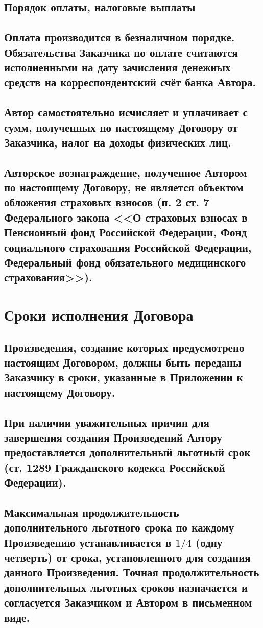 \documentclass[12pt]{article}
\begin{document}
\subsection*{\bf Порядок оплаты, налоговые выплаты}

\subsection{Оплата производится в безналичном порядке. Обязательства Заказчика по оплате считаются исполненными на дату зачисления денежных средств на корреспондентский счёт банка Автора.}

\subsection{Автор самостоятельно исчисляет и уплачивает с сумм, полученных по настоящему Договору от Заказчика, налог на доходы физических лиц.}

\subsection{Авторское вознаграждение, полученное Автором по настоящему Договору, не является объектом обложения страховых взносов (п. 2 ст. 7 Федерального закона <<О страховых взносах в Пенсионный фонд Российской Федерации, Фонд социального страхования Российской Федерации, Федеральный фонд обязательного медицинского страхования>>).}

\section{Сроки исполнения Договора}

\subsection{Произведения, создание которых предусмотрено настоящим Договором, должны быть переданы Заказчику в сроки, указанные в Приложении  к настоящему Договору.}

\subsection{При наличии уважительных причин для завершения создания Произведений Автору предоставляется дополнительный льготный срок (ст. 1289 Гражданского кодекса Российской Федерации).}

\subsection{Максимальная продолжительность дополнительного льготного срока по каждому Произведению устанавливается в $1/4$ (одну четверть) от срока, установленного для создания данного Произведения. Точная продолжительность дополнительных льготных сроков назначается и согласуется Заказчиком и Автором в письменном виде.}
\end{document}
